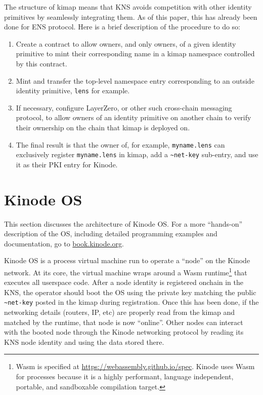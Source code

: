 \documentclass[runningheads]{llncs}
\begin{document}
The structure of kimap means that KNS avoids competition with other identity primitives by seamlessly integrating them.
As of this paper, this has already been done for ENS protocol.
Here is a brief description of the procedure to do so:
\begin{enumerate}
    \item Create a contract to allow owners, and only owners, of a given identity primitive to mint their corresponding name in a kimap namespace controlled by this contract.
    \item Mint and transfer the top-level namespace entry corresponding to an outside identity primitive, \verb|lens| for example.
    \item If necessary, configure LayerZero, or other such cross-chain messaging protocol, to allow owners of an identity primitive on another chain to verify their ownership on the chain that kimap is deployed on.
    \item The final result is that the owner of, for example, \verb|myname.lens| can exclusively register \verb|myname.lens| in kimap, add a \verb|~net-key| sub-entry, and use it as their PKI entry for Kinode.
\end{enumerate}

\section{Kinode OS}
\label{sec:os}

This section discusses the architecture of Kinode OS.
For a more ``hands-on'' description of the OS, including detailed programming examples and documentation, go to \href{https://book.kinode.org/}{book.kinode.org}.

Kinode OS is a process virtual machine run to operate a ``node'' on the Kinode network.
At its core, the virtual machine wraps around a Wasm runtime\footnote{Wasm is specified at \url{https://webassembly.github.io/spec}. Kinode uses Wasm for processes because it is a highly performant, language independent, portable, and sandboxable compilation target.}
that executes all userspace code.
After a node identity is registered onchain in the KNS, the operator should boot the OS using the private key matching the public \verb|~net-key| posted in the kimap during registration.
Once this has been done, if the networking details (routers, IP, etc) are properly read from the kimap and matched by the runtime, that node is now ``online''.
Other nodes can interact with the booted node through the Kinode networking protocol by reading its KNS node identity and using the data stored there.
\end{document}
